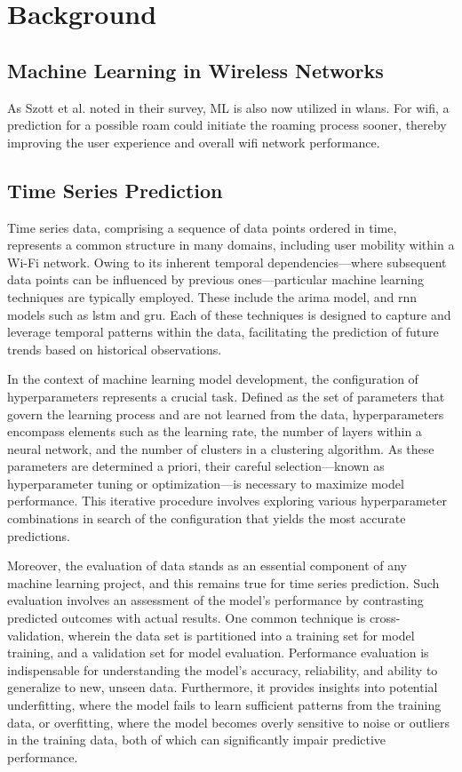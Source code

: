 \chapter{Background}\label{sec:background}

\section{Machine Learning in Wireless Networks}
As Szott et al. noted in their survey\cite{szottWiFiMeetsML2022}, ML is also now utilized in \acp{wlan}.
For \ac{wifi}, a prediction for a possible roam could initiate the roaming process sooner, thereby improving the user experience and overall \ac{wifi} network performance.

\section{Time Series Prediction}
Time series data, comprising a sequence of data points ordered in time, represents a common structure in many domains, including user mobility within a Wi-Fi network.
Owing to its inherent temporal dependencies—where subsequent data points can be influenced by previous ones—particular machine learning techniques are typically employed.
These include the \ac{arima} model, and \ac{rnn} models such as \ac{lstm} and \ac{gru}.
Each of these techniques is designed to capture and leverage temporal patterns within the data, facilitating the prediction of future trends based on historical observations.

In the context of machine learning model development, the configuration of hyperparameters represents a crucial task.
Defined as the set of parameters that govern the learning process and are not learned from the data, hyperparameters encompass elements such as the learning rate, the number of layers within a neural network, and the number of clusters in a clustering algorithm.
As these parameters are determined a priori, their careful selection—known as hyperparameter tuning or optimization—is necessary to maximize model performance.
This iterative procedure involves exploring various hyperparameter combinations in search of the configuration that yields the most accurate predictions.

Moreover, the evaluation of data stands as an essential component of any machine learning project, and this remains true for time series prediction.
Such evaluation involves an assessment of the model's performance by contrasting predicted outcomes with actual results.
One common technique is cross-validation, wherein the data set is partitioned into a training set for model training, and a validation set for model evaluation.
Performance evaluation is indispensable for understanding the model's accuracy, reliability, and ability to generalize to new, unseen data.
Furthermore, it provides insights into potential underfitting, where the model fails to learn sufficient patterns from the training data, or overfitting, where the model becomes overly sensitive to noise or outliers in the training data, both of which can significantly impair predictive performance.

